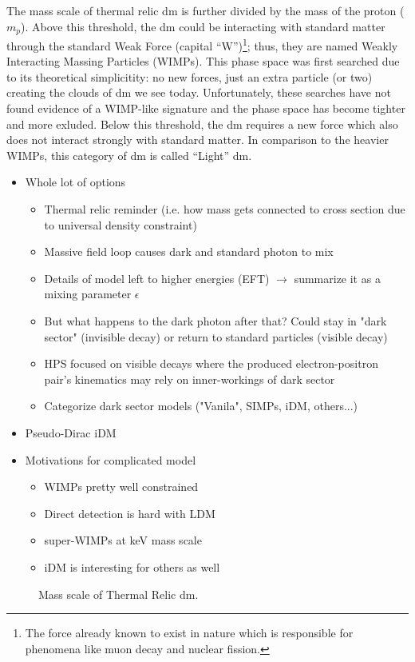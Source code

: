 The mass scale of thermal relic \gls{dm} is further divided by the mass of the proton ($m_p$).
Above this threshold, the \gls{dm} could be interacting with standard matter through the standard
Weak Force (capital ``W'')\footnote{The force already known to exist in nature which is responsible for phenomena
      like muon decay and nuclear fission.}; thus, they are named Weakly Interacting Massing Particles (WIMPs). This phase space was
first searched due to its theoretical simplicitity: no new forces, just an extra particle (or two)
creating the clouds of \gls{dm} we see today. Unfortunately, these searches have not found evidence
of a WIMP-like signature and the phase space has become tighter
and more exluded. Below this threshold, the \gls{dm} requires a new force which also does not interact
strongly with standard matter. In comparison to the heavier WIMPs, this category of \gls{dm} is called
``Light'' \gls{dm}.

\begin{itemize}
      \item Whole lot of options
            \begin{itemize}
                  \item Thermal relic reminder (i.e. how mass gets connected to cross section due to universal density constraint) \cite{thermal-freezeout-diagram-1996}
                  \item Massive field loop causes dark and standard photon to mix
                  \item Details of model left to higher energies (EFT) $\rightarrow$ summarize it as a mixing parameter $\epsilon$ \cite{kinetic-mixing-1986}
                  \item But what happens to the dark photon after that? Could stay in "dark sector" (invisible decay) or return to standard particles (visible decay)
                  \item HPS focused on visible decays where the produced electron-positron pair's kinematics may rely on inner-workings of dark sector
                  \item Categorize dark sector models ("Vanila", SIMPs, iDM, others...)
            \end{itemize}
      \item Pseudo-Dirac iDM
      \item Motivations for complicated model
            \begin{itemize}
                  \item WIMPs pretty well constrained \cite{supercdms-2018,damic-2020,xenon1t-2018}
                  \item Direct detection is hard with LDM \cite{ldmconstraints-2019}
                  \item super-WIMPs at keV mass scale \cite{superwimps-2008}
                  \item iDM is interesting for others as well \cite{darkseaquest-2018}
            \end{itemize}
\end{itemize}

\begin{figure}
      \centering
      
      \caption{Mass scale of Thermal Relic \gls{dm}.}
      \label{fig:dm-mass-scale}
\end{figure}
